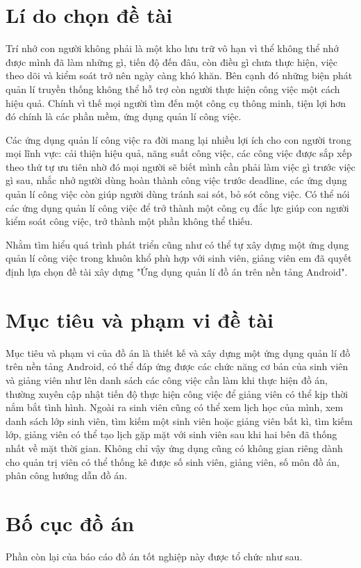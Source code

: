 \documentclass[../Main.tex]{subfiles}
\begin{document}
\section{Lí do chọn đề tài}
\label{section:1.1}
Trí nhớ con người không phải là một kho lưu trữ vô hạn vì thể không thể nhớ được mình đã làm những gì, tiến độ đến đâu, còn điều gì chưa thực hiện, việc theo dõi và kiểm soát trở nên ngày càng khó khăn. Bên cạnh đó những biện phát quản lí truyền thống không thể hỗ trợ còn người thực hiện công việc một cách hiệu quả. Chính vì thế mọi người tìm đến một công cụ thông minh, tiện lợi hơn đó chính là các phần mềm, ứng dụng quản lí công việc. 

Các ứng dụng quản lí công việc ra đời mang lại nhiều lợi ích cho con người trong mọi lĩnh vực: cải thiện hiệu quả,  năng suất công việc, các công việc được sắp xếp theo thứ tự ưu tiên nhờ đó mọi người sẽ biết mình cần phải làm việc gì trước việc gì sau, nhắc nhở người dùng hoàn thành công việc trước deadline, các ứng dụng quản lí công việc còn giúp người dùng tránh sai sót, bỏ sót công việc. Có thể nói các ứng dụng quản lí công việc để trở thành một công cụ đắc lực giúp con người kiểm soát công việc, trở thành một phần không thể thiếu.

Nhằm tìm hiểu quá trình phát triển cũng như có thể tự xây dựng một ứng dụng quản lí công việc trong khuôn khổ phù hợp với sinh viên, giảng viên em đã quyết định lựa chọn đề tài xây dựng "Ứng dụng quản lí đồ án trên nền tảng Android".

\section{Mục tiêu và phạm vi đề tài}
\label{section:1.2}
Mục tiêu và phạm vi của đồ án là thiết kế và xây dựng một ứng dụng quản lí đồ trên nền tảng Android, có thể đáp ứng được các chức năng cơ bản của sinh viên và giảng viên như lên danh sách các công việc cần làm khi thực hiện đồ án, thường xuyên cập nhật tiến độ thực hiện công việc để giảng viên có thể kịp thời nắm bắt tình hình. Ngoài ra sinh viên cũng có thể xem lịch học của mình, xem danh sách lớp sinh viên, tìm kiếm một sinh viên hoặc giảng viên bất kì, tìm kiếm lớp, giảng viên có thể tạo lịch gặp mặt với sinh viên sau khi hai bên đã thống nhất về mặt thời gian. Không chỉ vậy ứng dụng cũng có không gian riêng dành cho quản trị viên có thể thống kê được số sinh viên, giảng viên, số môn đồ án, phân công  hướng dẫn đồ án.

\section{Bố cục đồ án}
\label{section:1.3}
Phần còn lại của báo cáo đồ án tốt nghiệp này được tổ chức như sau. 
\end{document}
